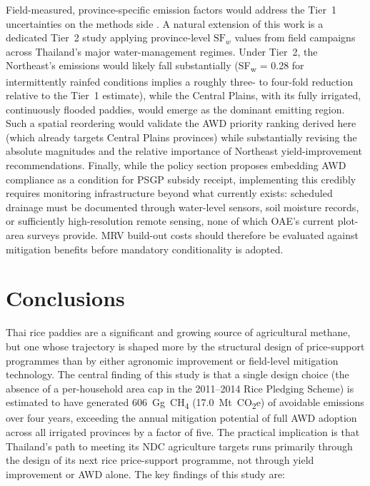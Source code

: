 \documentclass[fleqn,10pt]{olplainarticle}
\begin{document}
Field-measured, province-specific emission factors would address the Tier~1
uncertainties on the methods side \citep{wassmann2000, yan2009}.
A natural extension of this work is a dedicated Tier~2 study applying
province-level $\text{SF}_w$ values from field campaigns across Thailand's
major water-management regimes.
Under Tier~2, the Northeast's emissions would likely fall substantially
(SF\textsubscript{w} = 0.28 for intermittently rainfed conditions implies a
roughly three- to four-fold reduction relative to the Tier~1 estimate),
while the Central Plains, with its fully irrigated, continuously flooded
paddies, would emerge as the dominant emitting region.
Such a spatial reordering would validate the AWD priority ranking derived
here (which already targets Central Plains provinces) while substantially
revising the absolute magnitudes and the relative importance of Northeast
yield-improvement recommendations.
Finally, while the policy section proposes embedding AWD compliance as a
condition for PSGP subsidy receipt, implementing this credibly requires
monitoring infrastructure beyond what currently exists: scheduled drainage
must be documented through water-level sensors, soil moisture records, or
sufficiently high-resolution remote sensing, none of which OAE's current
plot-area surveys provide.
MRV build-out costs should therefore be evaluated against mitigation benefits
before mandatory conditionality is adopted.

\section*{Conclusions}

Thai rice paddies are a significant and growing source of agricultural
methane, but one whose trajectory is shaped more by the structural design
of price-support programmes than by either agronomic improvement or
field-level mitigation technology.
The central finding of this study is that a single design choice (the absence
of a per-household area cap in the 2011--2014 Rice Pledging Scheme) is
estimated to have generated 606~Gg~CH\textsubscript{4} (17.0~Mt~CO\textsubscript{2}e)
of avoidable emissions over four years, exceeding the annual mitigation
potential of full AWD adoption across all irrigated provinces by a factor of five.
The practical implication is that Thailand's path to meeting its NDC
agriculture targets runs primarily through the design of its next rice
price-support programme, not through yield improvement or AWD alone.
The key findings of this study are:
\end{document}
